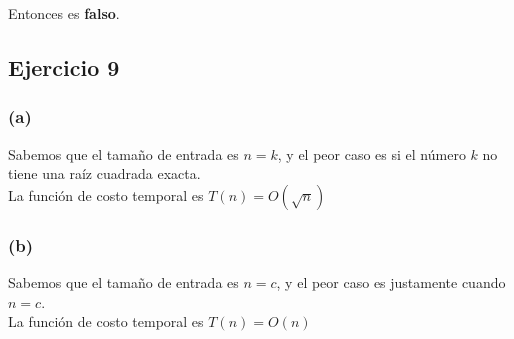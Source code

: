 \documentclass[12 pt]{article}
\begin{document}
            \begin{center}
            \end{center}

            Entonces es \textbf{falso}.

    \subsection*{Ejercicio 9}
        \subsubsection*{(a)}
            Sabemos que el tamaño de entrada es $n = k$, y el peor caso es si el número $k$ no tiene una raíz cuadrada exacta.
            \\
            La función de costo temporal es \(T(n) = O(\sqrt{n})\)
        \subsubsection*{(b)}    
            Sabemos que el tamaño de entrada es $n = c$, y el peor caso es justamente cuando $n = c$.
            \\
            La función de costo temporal es \(T(n) = O(n)\)
\end{document}
